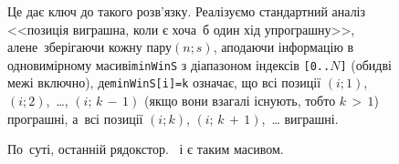 \begin{figure}[!b]

Це дає ключ до такого розв'язку. 
Реалізуємо стандартний аналіз
<<позиція виграшна, коли є хоча~б один хід у\nolinebreak[3] програшну>>, але\nolinebreak[2] не~зберігаючи кожну пару\nolinebreak[2] $(n;s)$, а\nolinebreak[3] подаючи інформацію в одновимірному масиві\nolinebreak[2] \texttt{minWinS} з діапазоном індексів \texttt{[0..}$N$\texttt{]} (обидві межі включно), де\nolinebreak[2] \texttt{minWinS[i]=k} означає, що всі позиції $(i;1)$, $(i;2)$,~\dots, ${(i;\,k\,{-}\,1)}$ (якщо вони взагалі існують, тобто ${k\,{>}\,1}$) програшні, а~всі позиції $(i;k)$, ${(i;\,k\,{+}\,1)}$,~\dots{} виграшні.

По~суті, останній рядок\nolinebreak[3] стор.~\pageref{fig:stick-with-spec-moves-positions} і є таким масивом.


\end{figure}
